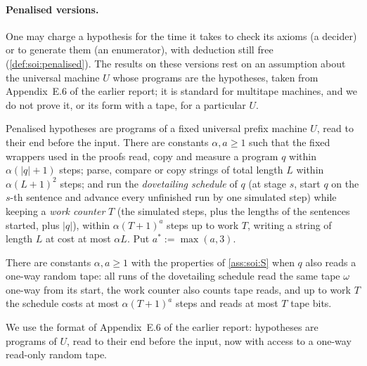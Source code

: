 \paragraph{Penalised versions.} One may charge a hypothesis for the time it takes to check its axioms (a decider) or to generate them (an enumerator), with deduction still free (\cref{def:soi:penalised}). The results on these versions rest on an assumption about the universal machine $U$ whose programs are the hypotheses, taken from Appendix~E.6 of the earlier report; it is standard for multitape machines, and we do not prove it, or its form with a tape, for a particular $U$.

\begin{assumption}\label{ass:soi:S}
Penalised hypotheses are programs of a fixed universal prefix machine $U$, read to their end before the input. There are constants $\alpha,a\ge1$ such that the fixed wrappers used in the proofs read, copy and measure a program $q$ within $\alpha(\lvert q\rvert+1)$ steps; parse, compare or copy strings of total length $L$ within $\alpha(L+1)^2$ steps; and run the \emph{dovetailing schedule} of $q$ (at stage $s$, start $q$ on the $s$-th sentence and advance every unfinished run by one simulated step) while keeping a \emph{work counter} $T$ (the simulated steps, plus the lengths of the sentences started, plus $\lvert q\rvert$), within $\alpha(T+1)^a$ steps up to work $T$, writing a string of length $L$ at cost at most $\alpha L$. Put $a^*:=\max(a,3)$.
\end{assumption}

\begin{assumption}\label{ass:soi:Stape}
There are constants $\alpha,a\ge1$ with the properties of \cref{ass:soi:S} when $q$ also reads a one-way random tape: all runs of the dovetailing schedule read the same tape $\omega$ one-way from its start, the work counter also counts tape reads, and up to work $T$ the schedule costs at most $\alpha(T+1)^a$ steps and reads at most $T$ tape bits.
\end{assumption}

We use the format of Appendix~E.6 of the earlier report: hypotheses are programs of $U$, read to their end before the input, now with access to a one-way read-only random tape.

